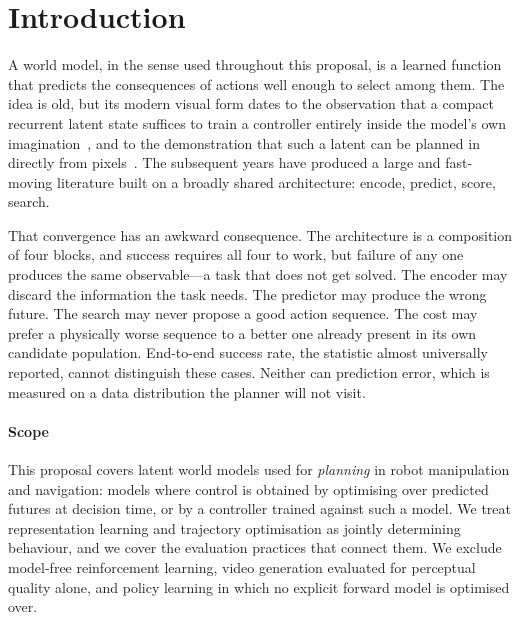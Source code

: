 \documentclass[11pt,letterpaper]{article}
\begin{document}
\tableofcontents

\section{Introduction}\label{sec:intro}

A world model, in the sense used throughout this proposal, is a learned function
that predicts the consequences of actions well enough to select among them. The
idea is old, but its modern visual form dates to the observation that a compact
recurrent latent state suffices to train a controller entirely inside the
model's own imagination~\citep{ha2018worldmodels}, and to the demonstration that
such a latent can be planned in directly from pixels~\citep{hafner2019planet}.
The subsequent years have produced a large and fast-moving literature built on a
broadly shared architecture: encode, predict, score, search.

That convergence has an awkward consequence. The architecture is a composition
of four blocks, and success requires all four to work, but failure of any one
produces the same observable---a task that does not get solved. The encoder may
discard the information the task needs. The predictor may produce the wrong
future. The search may never propose a good action sequence. The cost may prefer
a physically worse sequence to a better one already present in its own candidate
population. End-to-end success rate, the statistic almost universally reported,
cannot distinguish these cases. Neither can prediction error, which is measured
on a data distribution the planner will not visit.

\paragraph{Scope}
This proposal covers latent world models used for \emph{planning} in robot
manipulation and navigation: models where control is obtained by optimising over
predicted futures at decision time, or by a controller trained against such a
model. We treat representation learning and trajectory optimisation as jointly
determining behaviour, and we cover the evaluation practices that connect them.
We exclude model-free reinforcement learning, video generation evaluated for
perceptual quality alone, and policy learning in which no explicit forward model
is optimised over.
\end{document}
